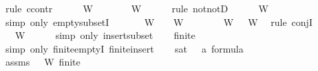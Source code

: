 \begin{isabellebody}
\ {\isacharparenleft}rule\ ccontr{\isacharparenright}\isanewline
\ \ \isamarkupfalse%
\ {\isachardoublequoteopen}{\isasymnot}{\isacharparenleft}{\isasymbottom}\ {\isasymnotin}\ W{\isacharparenright}{\isachardoublequoteclose}\isanewline
\ \ \isamarkupfalse%
\ \isamarkupfalse%
\ {\isachardoublequoteopen}{\isasymbottom}\ {\isasymin}\ W{\isachardoublequoteclose}\isanewline
\ \ \ \ \isamarkupfalse%
\ {\isacharparenleft}rule\ notnotD{\isacharparenright}\isanewline
\ \ \isamarkupfalse%
\ {\isachardoublequoteopen}{\isacharbraceleft}{\isacharbraceright}\ {\isasymsubseteq}\ W{\isachardoublequoteclose}\ \isanewline
\ \ \ \ \isamarkupfalse%
\ {\isacharparenleft}simp\ only{\isacharcolon}\ empty{\isacharunderscore}subsetI{\isacharparenright}\ \isanewline
\ \ \isamarkupfalse%
\ {\isachardoublequoteopen}{\isasymbottom}\ {\isasymin}\ W\ {\isasymand}\ {\isacharbraceleft}{\isacharbraceright}\ {\isasymsubseteq}\ W{\isachardoublequoteclose}\isanewline
\ \ \ \ \isamarkupfalse%
\ {\isacartoucheopen}{\isasymbottom}\ {\isasymin}\ W{\isacartoucheclose}\ {\isacartoucheopen}{\isacharbraceleft}{\isacharbraceright}\ {\isasymsubseteq}\ W{\isacartoucheclose}\ \isamarkupfalse%
\ {\isacharparenleft}rule\ conjI{\isacharparenright}\isanewline
\ \ \isamarkupfalse%
\ \isamarkupfalse%
\ {\isachardoublequoteopen}{\isacharbraceleft}{\isasymbottom}{\isacharbraceright}\ {\isasymsubseteq}\ W{\isachardoublequoteclose}\isanewline
\ \ \ \ \isamarkupfalse%
\ {\isacharparenleft}simp\ only{\isacharcolon}\ insert{\isacharunderscore}subset{\isacharparenright}\isanewline
\ \ \isamarkupfalse%
\ {\isachardoublequoteopen}finite\ {\isacharbraceleft}{\isasymbottom}{\isacharbraceright}{\isachardoublequoteclose}\ \isanewline
\ \ \ \ \isamarkupfalse%
\ {\isacharparenleft}simp\ only{\isacharcolon}\ finite{\isachardot}emptyI\ finite{\isacharunderscore}insert{\isacharparenright}\isanewline
\ \ \isamarkupfalse%
\ {\isachardoublequoteopen}sat\ {\isacharbraceleft}{\isasymbottom}\ {\isacharcolon}{\isacharcolon}\ {\isacharprime}a\ formula{\isacharbraceright}{\isachardoublequoteclose}\ \isanewline
\ \ \ \ \isamarkupfalse%
\ assms\ {\isacartoucheopen}{\isacharbraceleft}{\isasymbottom}{\isacharbraceright}\ {\isasymsubseteq}\ W{\isacartoucheclose}\ {\isacartoucheopen}finite\ {\isacharbraceleft}{\isasymbottom}{\isacharbraceright}{\isacartoucheclose}\ \isamarkupfalse%

\end{isabellebody}
